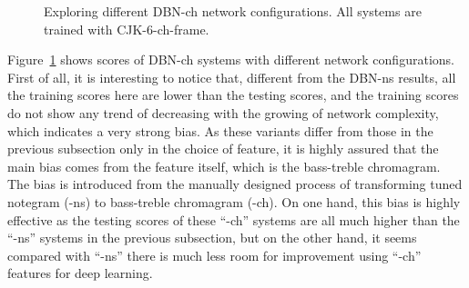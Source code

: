 \begin{figure}[htb]
	\centering
	\caption{Exploring different DBN-ch network configurations. All systems are trained with CJK-6-ch-frame.}
	\label{fig:3-dbn-ch-configs}
\end{figure}

Figure~\ref{fig:3-dbn-ch-configs} shows scores of DBN-ch systems with different network configurations. First of all, it is interesting to notice that, different from the DBN-ns results, all the training scores here are lower than the testing scores, and the training scores do not show any trend of decreasing with the growing of network complexity, which indicates a very strong bias. As these variants differ from those in the previous subsection only in the choice of feature, it is highly assured that the main bias comes from the feature itself, which is the bass-treble chromagram. The bias is introduced from the manually designed process of transforming tuned notegram (-ns) to bass-treble chromagram (-ch). On one hand, this bias is highly effective as the testing scores of these ``-ch'' systems are all much higher than the ``-ns'' systems in the previous subsection, but on the other hand, it seems compared with ``-ns'' there is much less room for improvement using ``-ch'' features for deep learning.


